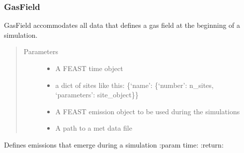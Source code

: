 \documentclass[letterpaper,10pt,english]{sphinxmanual}
\begin{document}
\subsubsection{GasField}
\label{\detokenize{index:gasfield}}

\begin{fulllineitems}
\label{\detokenize{index:feast.EmissionSimModules.infrastructure_classes.GasField}}
GasField accommodates all data that defines a gas field at the beginning of a simulation.
\begin{quote}\begin{description}
\item[{Parameters}] \leavevmode\begin{itemize}
\item {} 
 \textendash{} A FEAST time object

\item {} 
 \textendash{} a dict of sites like this: \{‘name’: \{‘number’: n\_sites, ‘parameters’: site\_object\}\}

\item {} 
 \textendash{} A FEAST emission object to be used during the simulations

\item {} 
 \textendash{} A path to a met data file

\end{itemize}

\end{description}\end{quote}

\begin{fulllineitems}
\label{\detokenize{index:feast.EmissionSimModules.infrastructure_classes.GasField.emerging_emissions}}
Defines emissions that emerge during a simulation
:param time:
:return:


\end{fulllineitems}
\end{fulllineitems}
\end{document}
